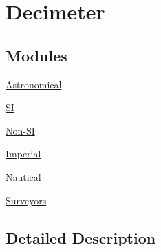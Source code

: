 \hypertarget{group___e_g_x_math-_conversions-_length_conversions-_decimeter}{}\section{Decimeter}
\label{group___e_g_x_math-_conversions-_length_conversions-_decimeter}
\subsection*{Modules}
\begin{DoxyCompactItemize}
\item 
\mbox{\hyperlink{group___e_g_x_math-_conversions-_length_conversions-_decimeter-_astronomical}{Astronomical}}
\item 
\mbox{\hyperlink{group___e_g_x_math-_conversions-_length_conversions-_decimeter-_s_i}{SI}}
\item 
\mbox{\hyperlink{group___e_g_x_math-_conversions-_length_conversions-_decimeter-_non-_s_i}{Non-\/\+SI}}
\item 
\mbox{\hyperlink{group___e_g_x_math-_conversions-_length_conversions-_decimeter-_imperial}{Imperial}}
\item 
\mbox{\hyperlink{group___e_g_x_math-_conversions-_length_conversions-_decimeter-_nautical}{Nautical}}
\item 
\mbox{\hyperlink{group___e_g_x_math-_conversions-_length_conversions-_decimeter-_surveyors}{Surveyors}}
\end{DoxyCompactItemize}


\subsection{Detailed Description}
